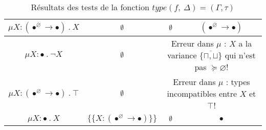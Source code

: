 \documentclass{rapport}
\renewcommand{\emptyset}{\font\cmsy = cmsy10 at 10pt
 \hbox{\cmsy \char 59}
}
\theoremstyle{plain}
\theoremstyle{remark}
\theoremstyle{definition}
\begin{document}
\begin{table}[H]
\begin{tabular}[b]{|c|c||c|c|}
  	\hline
  	$\mu X : (\bullet^{\overline{\varnothing}} \rightarrow \bullet) \ . \ X$ & $\emptyset$ & $\emptyset$ & $(\bullet^{\overline{\varnothing}} \rightarrow \bullet)$ \\
  	\hline
 	$\mu X : \bullet \ . \ \neg X$ & $\emptyset$ & \multicolumn{2}{c|}{Erreur dans $\mu$ : $X$ a la variance ${\overline{\{\sqcap, \sqcup\}}}$ qui n'est pas $\succcurlyeq \varnothing$!} \\
 	\hline
 	$\mu X : (\bullet^{\varnothing} \rightarrow \bullet) \ . \ \top$ & $\emptyset$ & \multicolumn{2}{c|}{Erreur dans $\mu$ : types incompatibles entre $X$ et $\top$!} \\
 	\hline
 	$\mu X : \bullet \ . \ X$ & $\{{\{X : (\bullet^{\varnothing} \rightarrow \bullet)\}}\}$ & $\emptyset$ & $\bullet$ \\
 	\hline
    \end{tabular}
    \caption{Résultats des tests de la fonction $type(f, \ \Delta) = (\Gamma, \tau)$}
    \label{table : résultats1}
\end{table}
\end{document}
